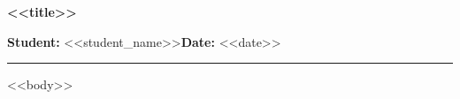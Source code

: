 \documentclass[12pt,a4paper]{article}
\begin{document}
\begin{center}{\Large\bfseries <<title>>}\end{center}
\noindent\textbf{Student:} <<student_name>>\hfill\textbf{Date:} <<date>>
\hrule\medskip

<<body>>
\end{document}
